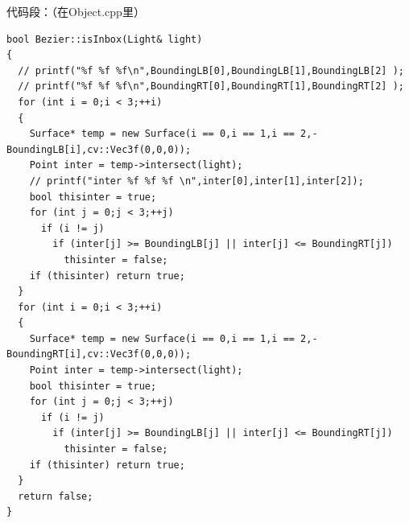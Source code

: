 \documentclass[10pt, a4paper]{article}
\begin{document}
          代码段：（在Object.cpp里）
          \begin{lstlisting}
bool Bezier::isInbox(Light& light)
{
  // printf("%f %f %f\n",BoundingLB[0],BoundingLB[1],BoundingLB[2] );
  // printf("%f %f %f\n",BoundingRT[0],BoundingRT[1],BoundingRT[2] );
  for (int i = 0;i < 3;++i)
  {
    Surface* temp = new Surface(i == 0,i == 1,i == 2,-BoundingLB[i],cv::Vec3f(0,0,0));
    Point inter = temp->intersect(light);
    // printf("inter %f %f %f \n",inter[0],inter[1],inter[2]);
    bool thisinter = true;
    for (int j = 0;j < 3;++j)
      if (i != j)
        if (inter[j] >= BoundingLB[j] || inter[j] <= BoundingRT[j])
          thisinter = false;
    if (thisinter) return true;
  }
  for (int i = 0;i < 3;++i)
  {
    Surface* temp = new Surface(i == 0,i == 1,i == 2,-BoundingRT[i],cv::Vec3f(0,0,0));
    Point inter = temp->intersect(light);
    bool thisinter = true;
    for (int j = 0;j < 3;++j)
      if (i != j)
        if (inter[j] >= BoundingLB[j] || inter[j] <= BoundingRT[j])
          thisinter = false;
    if (thisinter) return true;
  }
  return false;
}


\end{lstlisting}
\end{document}
